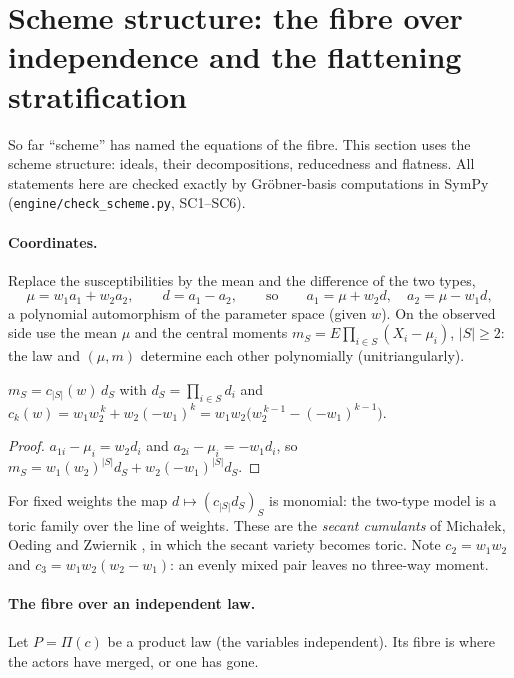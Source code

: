 \documentclass[11pt]{article}
\theoremstyle{definition}\newtheorem{definition}[theorem]{Definition}\newtheorem{remark}[theorem]{Remark}\newtheorem{example}[theorem]{Example}
\begin{document}
\section{Scheme structure: the fibre over independence and the flattening stratification}\label{sec:scheme}

So far ``scheme'' has named the equations of the fibre. This section uses the scheme structure: ideals, their decompositions, reducedness
and flatness. All statements here are checked exactly by Gr\"obner-basis computations \cite{CoxLittleOShea2015} in SymPy \cite{SymPy2017} (\texttt{engine/check\_scheme.py}, SC1--SC6).

\paragraph{Coordinates.}
Replace the susceptibilities by the mean and the difference of the two types,
\[
  \mu=w_1a_1+w_2a_2,\qquad d=a_1-a_2,\qquad\text{so}\qquad a_1=\mu+w_2d,\quad a_2=\mu-w_1d ,
\]
a polynomial automorphism of the parameter space (given $w$). On the observed side use the mean $\mu$ and the central moments
$m_S=E\prod_{i\in S}(X_i-\mu_i)$, $|S|\ge2$: the law and $(\mu,m)$ determine each other polynomially (unitriangularly).

\begin{proposition}\label{prop:normal}
$m_S=c_{|S|}(w)\,d_S$ with $d_S=\prod_{i\in S}d_i$ and $c_k(w)=w_1w_2^{\,k}+w_2(-w_1)^k=w_1w_2\big(w_2^{\,k-1}-(-w_1)^{k-1}\big)$.
\end{proposition}

\begin{proof}
$a_{1i}-\mu_i=w_2d_i$ and $a_{2i}-\mu_i=-w_1d_i$, so $m_S=w_1(w_2)^{|S|}d_S+w_2(-w_1)^{|S|}d_S$.
\end{proof}

For fixed weights the map $d\mapsto(c_{|S|}d_S)_S$ is monomial: the two-type model is a toric family over the line of weights. These are
the \emph{secant cumulants} of Michałek, Oeding and Zwiernik \cite{MichalekOedingZwiernik2015}, in which the secant variety becomes
toric. Note $c_2=w_1w_2$ and $c_3=w_1w_2(w_2-w_1)$: an evenly mixed pair leaves no three-way moment.

\paragraph{The fibre over an independent law.}
Let $P=\Pi(c)$ be a product law (the variables independent). Its fibre is where the actors have merged, or one has gone.
\end{document}
